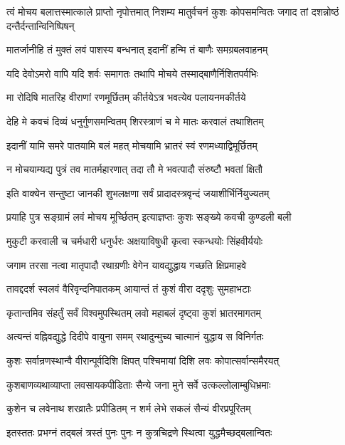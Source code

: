 \threelineshloka
{त्वं मोचय बलात्तस्मात्काले प्राप्तो नृपोत्तमात्}
{निशम्य मातुर्वचनं कुशः कोपसमन्वितः}
{जगाद तां दशन्नोष्ठं दन्तैर्दन्तान्विनिष्पिषन्}%


\twolineshloka
{मातर्जानीहि तं मुक्तं लवं पाशस्य बन्धनात्}
{इदानीं हन्मि तं बाणैः समग्रबलवाहनम्}%

\twolineshloka
{यदि देवोऽमरो वापि यदि शर्वः समागतः}
{तथापि मोचये तस्माद्बाणैर्निशितपर्वभिः}%

\twolineshloka
{मा रोदिषि मातरिह वीराणां रणमूर्छितम्}
{कीर्तयेऽत्र भवत्येव पलायनमकीर्तये}%

\twolineshloka
{देहि मे कवचं दिव्यं धनुर्गुणसमन्वितम्}
{शिरस्त्राणं च मे मातः करवालं तथाशितम्}%

\twolineshloka
{इदानीं यामि समरे पातयामि बलं महत्}
{मोचयामि भ्रातरं स्वं रणमध्याद्विमूर्छितम्}%

\twolineshloka
{न मोचयाम्यद्य पुत्रं तव मातर्महारणात्}
{तदा तौ मे भवत्पादौ संरुष्टौ भवतां क्षितौ}%


\twolineshloka
{इति वाक्येन सन्तुष्टा जानकी शुभलक्षणा}
{सर्वं प्रादादस्त्रवृन्दं जयाशीर्भिर्नियुज्यतम्}%

\twolineshloka
{प्रयाहि पुत्र सङ्ग्रामं लवं मोचय मूर्च्छितम्}
{इत्याज्ञप्तः कुशः सङ्ख्ये कवची कुण्डली बली}%

\twolineshloka
{मुकुटी करवाली च चर्मधारी धनुर्धरः}
{अक्षयाविषुधी कृत्वा स्कन्धयोः सिंहवीर्ययोः}%

\twolineshloka
{जगाम तरसा नत्वा मातृपादौ रथाग्रणीः}
{वेगेन यावद्युद्धाय गच्छति क्षिप्रमाहवे}%

\twolineshloka
{तावद्ददर्श स्वलवं वैरिवृन्दनिपातकम्}
{आयान्तं तं कुशं वीरा ददृशुः सुमहाभटाः}%

\twolineshloka
{कृतान्तमिव संहर्तुं सर्वं विश्वमुपस्थितम्}
{लवो महाबलं दृष्ट्वा कुशं भ्रातरमागतम्}%

\twolineshloka
{अत्यन्तं वह्निवद्युद्धे दिदीपे वायुना समम्}
{रथादुन्मुच्य चात्मानं युद्धाय स विनिर्गतः}%

\twolineshloka
{कुशः सर्वान्रणस्थान्वै वीरान्पूर्वदिशि क्षिपत्}
{पश्चिमायां दिशि लवः कोपात्सर्वान्समैरयत्}%

\twolineshloka
{कुशबाणव्यथाव्याप्ता लवसायकपीडिताः}
{सैन्ये जना मुने सर्वे उत्कल्लोलाम्बुधिभ्रमाः}%

\twolineshloka
{कुशेन च लवेनाथ शरव्रातैः प्रपीडितम्}
{न शर्म लेभे सकलं सैन्यं वीरप्रपूरितम्}%

\twolineshloka
{इतस्ततः प्रभग्नं तद्बलं त्रस्तं पुनः पुनः}
{न कुत्रचिद्रणे स्थित्वा युद्धमैच्छद्बलान्वितः}%

